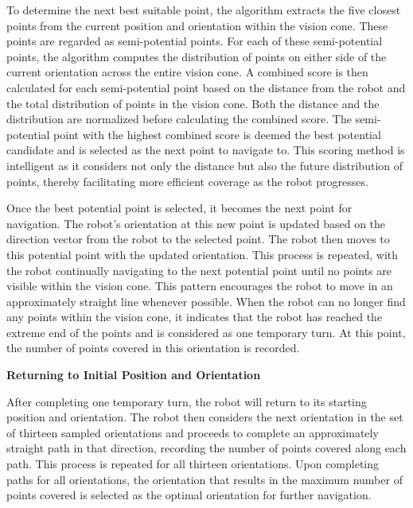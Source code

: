 \vspace*{6mm}  

To determine the next best suitable point, the algorithm extracts the five closest points from the current position and orientation within the vision cone. These points are regarded as semi-potential points. For each of these semi-potential points, the algorithm computes the distribution of points on either side of the current orientation across the entire vision cone. A combined score is then calculated for each semi-potential point based on the distance from the robot and the total distribution of points in the vision cone. Both the distance and the distribution are normalized before calculating the combined score. The semi-potential point with the highest combined score is deemed the best potential candidate and is selected as the next point to navigate to. This scoring method is intelligent as it considers not only the distance but also the future distribution of points, thereby facilitating more efficient coverage as the robot progresses.

\vspace*{6mm}  

Once the best potential point is selected, it becomes the next point for navigation. The robot's orientation at this new point is updated based on the direction vector from the robot to the selected point. The robot then moves to this potential point with the updated orientation. This process is repeated, with the robot continually navigating to the next potential point until no points are visible within the vision cone. This pattern encourages the robot to move in an approximately straight line whenever possible. When the robot can no longer find any points within the vision cone, it indicates that the robot has reached the extreme end of the points and is considered as one temporary turn. At this point, the number of points covered in this orientation is recorded.

\vspace*{6mm}  

\textbf{Returning to Initial Position and Orientation}

After completing one temporary turn, the robot will return to its starting position and orientation. The robot then considers the next orientation in the set of thirteen sampled orientations and proceeds to complete an approximately straight path in that direction, recording the number of points covered along each path. This process is repeated for all thirteen orientations. Upon completing paths for all orientations, the orientation that results in the maximum number of points covered is selected as the optimal orientation for further navigation.
\vspace*{6mm}  

